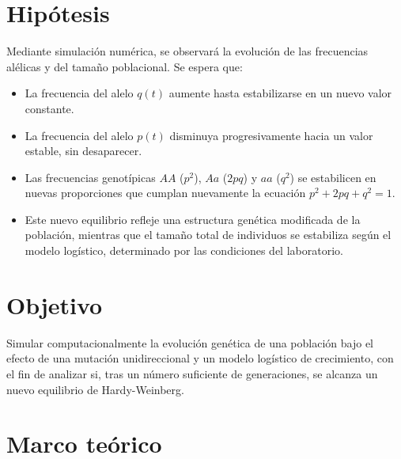 \documentclass[12pt]{article}
\begin{document}
\section{Hipótesis}

Mediante simulación numérica, se observará la evolución de las frecuencias alélicas y del tamaño poblacional. Se espera que:

\begin{itemize}
  \item La frecuencia del alelo $q(t)$ aumente hasta estabilizarse en un nuevo valor constante.
  \item La frecuencia del alelo $p(t)$ disminuya progresivamente hacia un valor estable, sin desaparecer.
  \item Las frecuencias genotípicas $AA$ ($p^2$), $Aa$ ($2pq$) y $aa$ ($q^2$) se estabilicen en nuevas proporciones que cumplan nuevamente la ecuación $p^2 + 2pq + q^2 = 1$.
  \item Este nuevo equilibrio refleje una estructura genética modificada de la población, mientras que el tamaño total de individuos se estabiliza según el modelo logístico, determinado por las condiciones del laboratorio.
\end{itemize}

\section{Objetivo}


Simular computacionalmente la evolución genética de una población bajo el efecto de una mutación unidireccional y un modelo logístico de crecimiento, con el fin de analizar si, tras un número suficiente de generaciones, se alcanza un nuevo equilibrio de Hardy-Weinberg.

\section{Marco teórico}
\end{document}
